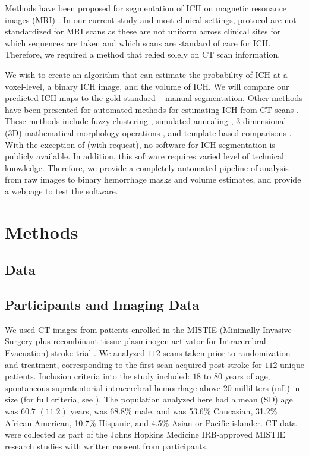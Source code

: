 \documentclass{elsarticle_nonatbib}\usepackage[]{graphicx}\usepackage[]{color}
\begin{document}
Methods have been proposed for segmentation of ICH on magnetic resonance images (MRI) \citep{wang_hematoma_2013, carhuapoma2003brain}.  In our current study and most clinical settings, protocol are not standardized for MRI scans as these are not uniform across clinical sites for which sequences are taken and which scans are standard of care for ICH.  Therefore, we required a method that relied solely on CT scan information.

We wish to create an algorithm that can estimate the probability of ICH at a voxel-level, a binary ICH image, and the volume of ICH.  We will compare our predicted ICH maps to the gold standard -- manual segmentation.  Other methods have been presented for automated methods for estimating ICH from CT scans \citep{ gillebert_automated_2014, prakash_segmentation_2012, loncaric_hierarchical_1996, loncaric_quantitative_1999, perez_set_2007}.  These methods include fuzzy clustering \citep{prakash_segmentation_2012, loncaric_hierarchical_1996}, simulated annealing \citep{loncaric_quantitative_1999}, 3-dimensional (3D) mathematical morphology operations \citep{perez_set_2007}, and template-based comparisons \citep{gillebert_automated_2014}.  With the exception of \citet{gillebert_automated_2014} (with request), no software for ICH segmentation is publicly available.  In addition, this software requires varied level of technical knowledge.  Therefore, we provide a completely automated pipeline of analysis from raw images to binary hemorrhage masks and volume estimates, and provide a webpage to test the software. 


\section{Methods}

\subsection{Data} 
\subsection{ Participants and Imaging Data }
We used CT images from patients enrolled in the MISTIE (Minimally Invasive Surgery plus recombinant-tissue plasminogen activator for Intracerebral Evacuation) stroke trial \citep{morgan_preliminary_2008_mistie}. We analyzed $112$ scans taken prior to randomization and treatment, corresponding to the first scan acquired post-stroke for $112$ unique patients.  Inclusion criteria into the study included: $18$ to $80$ years of age, spontaneous supratentorial intracerebral hemorrhage above $20$ milliliters (mL) in size (for full criteria, see \citet{mould_minimally_2013}).  The population analyzed here had a mean (SD) age was $60.7$ $(11.2)$ years, was $68.8\%$ male, and was 53.6\% Caucasian, 31.2\% African American, 10.7\% Hispanic, and 4.5\% Asian or Pacific islander.  CT data were collected as part of the Johns Hopkins Medicine IRB-approved MISTIE research studies with written consent from participants.  
\end{document}
